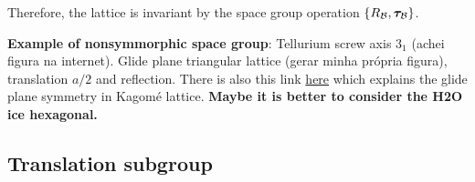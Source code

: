 Therefore, the lattice is invariant by the space group operation $\{R_{\mathcal{B}}, {\bm{\tau}}_{\mathcal{B}}\}$.

\n

\textbf{Example of nonsymmorphic space group}: Tellurium screw axis $3_1$ (achei figura na internet). Glide plane triangular lattice (gerar minha própria figura), translation $a/2$ and reflection. There is also this link \href{https://physics.stackexchange.com/questions/568476/example-of-a-space-group-which-does-not-contain-the-point-group-as-a-subgroup}{here} which explains the glide plane symmetry in Kagomé lattice. \textbf{Maybe it is better to consider the H2O ice hexagonal.}

%
%
%

\subsection{Translation subgroup}


